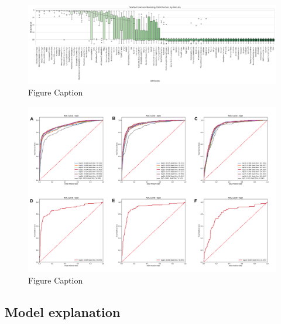 \documentclass[final,1p,times,authoryear]{elsarticle}
\begin{document}
\begin{figure}[t]%
    \centering%
    \includegraphics[width=\textwidth]{figures/boruta_by_group.png}
    \caption{Figure Caption}\label{Figure2}
\end{figure}


\begin{figure}[t]%
    \centering%
    \includegraphics[width=\textwidth]{figures/topn_extval25.png}
    \caption{Figure Caption}\label{Figure3}
\end{figure}


\subsection{Model explanation}\label{ModelExplanationResults}
\end{document}
